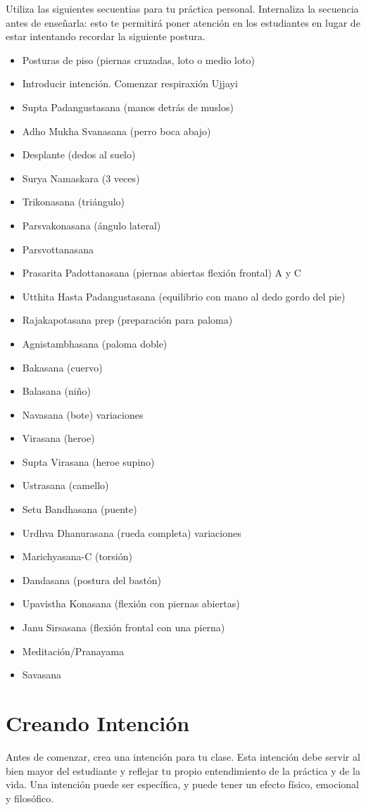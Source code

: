 Utiliza las siguientes secuentias para tu práctica personal. Internaliza la secuencia antes de enseñarla: esto te permitirá poner atención en los estudiantes en lugar de estar intentando recordar la siguiente postura.
\begin{itemize}
	\item Posturas de piso (piernas cruzadas, loto o medio loto)
	\item Introducir intención. Comenzar respiraxión Ujjayi
	\item Supta Padangustasana (manos detrás de muslos)
	\item Adho Mukha Svanasana (perro boca abajo)
	\item Desplante (dedos al suelo)
	\item Surya Namaskara (3 veces)
	\item Trikonasana (triángulo)
	\item Parsvakonasana (ángulo lateral)
	\item Parsvottanasana
	\item Prasarita Padottanasana (piernas abiertas flexión frontal) A y C
	\item Utthita Hasta Padangustasana (equilibrio con mano al dedo gordo del pie)
	\item Rajakapotasana prep (preparación para paloma)
	\item Agnistambhasana (paloma doble)
	\item Bakasana (cuervo)
	\item Balasana (niño)
	\item Navasana (bote) variaciones
	\item Virasana (heroe)
	\item Supta Virasana (heroe supino)
	\item Ustrasana (camello)
	\item Setu Bandhasana (puente)
	\item Urdhva Dhanurasana (rueda completa) variaciones
	\item Marichyasana-C (torsión)
	\item Dandasana (postura del bastón)
	\item Upavistha Konasana (flexión con piernas abiertas)
	\item Janu Sirsasana (flexión frontal con una pierna)
	\item Meditación/Pranayama
	\item Savasana
\end{itemize}

\section{Creando Intención}
Antes de comenzar, crea una intención para tu clase. Esta intención debe servir al bien mayor del estudiante y reflejar tu propio entendimiento de la práctica y de la vida. Una intención puede ser específica, y puede tener un efecto físico, emocional y filosófico.

